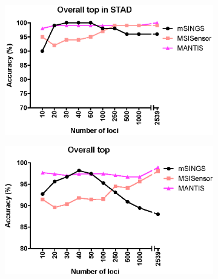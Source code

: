 \begin{figure}[p]
\begin{subfigure}{0.33\textwidth}
		\includegraphics[width=\linewidth,keepaspectratio]{images/msilandscape/tool_performance_top_loci_stad}
		\caption{}\label{fig:msilandscape:tool_performance_top_loci_stad}
	\end{subfigure}
	\par
	\begin{subfigure}{0.33\textwidth}
		\includegraphics[width=\linewidth,keepaspectratio]{images/msilandscape/tool_performance_top_loci_all}
		\caption{}\label{fig:msilandscape:tool_performance_top_loci_all}
	\end{subfigure}

\end{figure}
